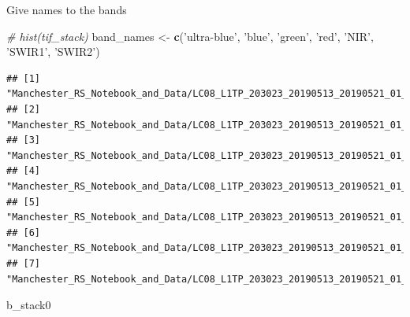 \documentclass[]{article}
\newenvironment{Shaded}{\begin{snugshade}}{\end{snugshade}}
\newcommand{\CommentTok}[1]{\textcolor[rgb]{0.56,0.35,0.01}{\textit{#1}}}
\newcommand{\DataTypeTok}[1]{\textcolor[rgb]{0.13,0.29,0.53}{#1}}
\newcommand{\DecValTok}[1]{\textcolor[rgb]{0.00,0.00,0.81}{#1}}
\newcommand{\KeywordTok}[1]{\textcolor[rgb]{0.13,0.29,0.53}{\textbf{#1}}}
\newcommand{\NormalTok}[1]{#1}
\newcommand{\OtherTok}[1]{\textcolor[rgb]{0.56,0.35,0.01}{#1}}
\newcommand{\StringTok}[1]{\textcolor[rgb]{0.31,0.60,0.02}{#1}}
\begin{document}
Give names to the bands

\begin{Shaded}
\begin{Highlighting}[]
\CommentTok{# hist(tif_stack)}
\NormalTok{band_names <-}\StringTok{ }\KeywordTok{c}\NormalTok{(}\StringTok{'ultra-blue'}\NormalTok{, }\StringTok{'blue'}\NormalTok{, }\StringTok{'green'}\NormalTok{, }\StringTok{'red'}\NormalTok{, }\StringTok{'NIR'}\NormalTok{, }\StringTok{'SWIR1'}\NormalTok{, }\StringTok{'SWIR2'}\NormalTok{)}
\end{Highlighting}
\end{Shaded}

\begin{Shaded}
\end{Shaded}

\begin{verbatim}
## [1] "Manchester_RS_Notebook_and_Data/LC08_L1TP_203023_20190513_20190521_01_T1_B1.TIF"
## [2] "Manchester_RS_Notebook_and_Data/LC08_L1TP_203023_20190513_20190521_01_T1_B2.TIF"
## [3] "Manchester_RS_Notebook_and_Data/LC08_L1TP_203023_20190513_20190521_01_T1_B3.TIF"
## [4] "Manchester_RS_Notebook_and_Data/LC08_L1TP_203023_20190513_20190521_01_T1_B4.TIF"
## [5] "Manchester_RS_Notebook_and_Data/LC08_L1TP_203023_20190513_20190521_01_T1_B5.TIF"
## [6] "Manchester_RS_Notebook_and_Data/LC08_L1TP_203023_20190513_20190521_01_T1_B6.TIF"
## [7] "Manchester_RS_Notebook_and_Data/LC08_L1TP_203023_20190513_20190521_01_T1_B7.TIF"
\end{verbatim}

\begin{Shaded}
\begin{Highlighting}[]
\NormalTok{b_stack0}
\end{Highlighting}
\end{Shaded}
\end{document}
